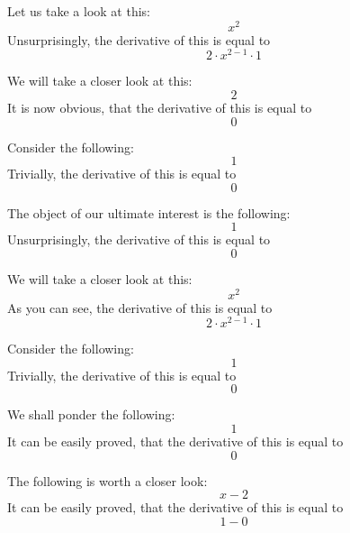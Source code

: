 \documentclass{article}
\begin{document}
Let us take a look at this:
\begin{equation}
x ^{2 } 
\end{equation}
Unsurprisingly, the derivative of this is equal to
\begin{equation}
2 \cdot x ^{2 - 1 } \cdot 1 
\end{equation}

We will take a closer look at this:
\begin{equation}
2 
\end{equation}
It is now obvious, that the derivative of this is equal to
\begin{equation}
0 
\end{equation}

Consider the following:
\begin{equation}
1 
\end{equation}
Trivially, the derivative of this is equal to
\begin{equation}
0 
\end{equation}

The object of our ultimate interest is the following:
\begin{equation}
1 
\end{equation}
Unsurprisingly, the derivative of this is equal to
\begin{equation}
0 
\end{equation}

We will take a closer look at this:
\begin{equation}
x ^{2 } 
\end{equation}
As you can see, the derivative of this is equal to
\begin{equation}
2 \cdot x ^{2 - 1 } \cdot 1 
\end{equation}

Consider the following:
\begin{equation}
1 
\end{equation}
Trivially, the derivative of this is equal to
\begin{equation}
0 
\end{equation}

We shall ponder the following:
\begin{equation}
1 
\end{equation}
It can be easily proved, that the derivative of this is equal to
\begin{equation}
0 
\end{equation}

The following is worth a closer look:
\begin{equation}
x - 2 
\end{equation}
It can be easily proved, that the derivative of this is equal to
\begin{equation}
1 - 0 
\end{equation}
\end{document}
